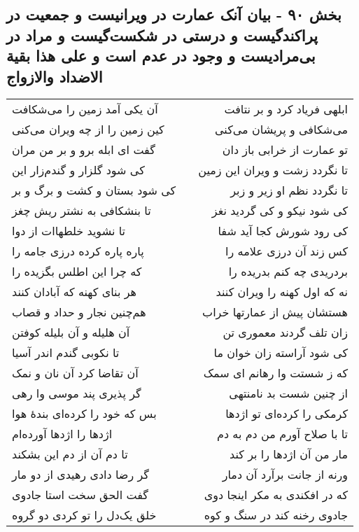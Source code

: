 \begin{center}
\section*{بخش ۹۰ - بیان آنک عمارت در ویرانیست و جمعیت در پراکندگیست و  درستی در شکست‌گیست و مراد در بی‌مرادیست و وجود در عدم  است و علی هذا بقیة الاضداد والازواج}
\label{sec:sh090}
\begin{longtable}{l p{0.5cm} r}
آن یکی آمد زمین را می‌شکافت
&&
ابلهی فریاد کرد و بر نتافت
\\
کین زمین را از چه ویران می‌کنی
&&
می‌شکافی و پریشان می‌کنی
\\
گفت ای ابله برو و بر من مران
&&
تو عمارت از خرابی باز دان
\\
کی شود گلزار و گندم‌زار این
&&
تا نگردد زشت و ویران این زمین
\\
کی شود بستان و کشت و برگ و بر
&&
تا نگردد نظم او زیر و زبر
\\
تا بنشکافی به نشتر ریش چغز
&&
کی شود نیکو و کی گردید نغز
\\
تا نشوید خلطهاات از دوا
&&
کی رود شورش کجا آید شفا
\\
پاره پاره کرده درزی جامه را
&&
کس زند آن درزی علامه را
\\
که چرا این اطلس بگزیده را
&&
بردریدی چه کنم بدریده را
\\
هر بنای کهنه که آبادان کنند
&&
نه که اول کهنه را ویران کنند
\\
هم‌چنین نجار و حداد و قصاب
&&
هستشان پیش از عمارتها خراب
\\
آن هلیله و آن بلیله کوفتن
&&
زان تلف گردند معموری تن
\\
تا نکوبی گندم اندر آسیا
&&
کی شود آراسته زان خوان ما
\\
آن تقاضا کرد آن نان و نمک
&&
که ز شستت وا رهانم ای سمک
\\
گر پذیری پند موسی وا رهی
&&
از چنین شست بد نامنتهی
\\
بس که خود را کرده‌ای بندهٔ هوا
&&
کرمکی را کرده‌ای تو اژدها
\\
اژدها را اژدها آورده‌ام
&&
تا با صلاح آورم من دم به دم
\\
تا دم آن از دم این بشکند
&&
مار من آن اژدها را بر کند
\\
گر رضا دادی رهیدی از دو مار
&&
ورنه از جانت برآرد آن دمار
\\
گفت الحق سخت استا جادوی
&&
که در افکندی به مکر اینجا دوی
\\
خلق یک‌دل را تو کردی دو گروه
&&
جادوی رخنه کند در سنگ و کوه
\\

\end{longtable}
\end{center}
